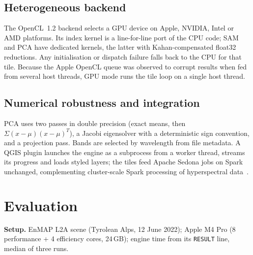 \documentclass[conference]{IEEEtran}
\begin{document}
\subsection{Heterogeneous backend}
The OpenCL~1.2 backend selects a GPU device on Apple, NVIDIA, Intel or AMD
platforms. Its index kernel is a line-for-line port of the CPU code;
SAM~\cite{kruse1993sips} and PCA have dedicated kernels, the latter with Kahan-compensated
float32 reductions. Any initialisation or dispatch failure falls back to the
CPU for that tile. Because the Apple OpenCL queue was observed to corrupt
results when fed from several host threads, GPU mode runs the tile loop on a
single host thread.

\subsection{Numerical robustness and integration}
PCA uses two passes in double precision (exact means, then
$\Sigma(x-\mu)(x-\mu)^{T}$), a Jacobi eigensolver with a deterministic sign
convention, and a projection pass. Bands are selected by wavelength from file
metadata. A QGIS plugin launches the engine as a subprocess from a worker
thread, streams its progress and loads styled layers; the tiles feed Apache
Sedona jobs on Spark unchanged, complementing cluster-scale Spark
processing of hyperspectral data~\cite{wu2016spark}.

\section{Evaluation}
\textbf{Setup.} EnMAP L2A scene (Tyrolean Alps, 12 June 2022); Apple M4 Pro
(8 performance + 4 efficiency cores, 24\,GB); engine time from its
\texttt{RESULT} line, median of three runs.
\end{document}
